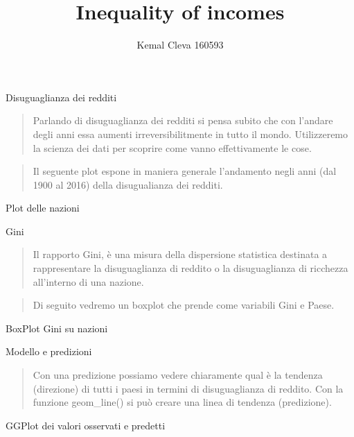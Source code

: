 \documentclass[
  ignorenonframetext,
]{beamer}
\title{Inequality of incomes}
\author{Kemal Cleva 160593}
\date{}
\begin{document}
\frame{\titlepage}

\begin{frame}{Disuguaglianza dei redditi}
\protect\hypertarget{disuguaglianza-dei-redditi}{}
\begin{quote}
Parlando di disuguaglianza dei redditi si pensa subito che con l'andare
degli anni essa aumenti irreversibilitmente in tutto il mondo.
Utilizzeremo la scienza dei dati per scoprire come vanno effettivamente
le cose.
\end{quote}

\begin{quote}
Il seguente plot espone in maniera generale l'andamento negli anni (dal
1900 al 2016) della disugualianza dei redditi.
\end{quote}
\end{frame}

\begin{frame}{Plot delle nazioni}
\protect\hypertarget{plot-delle-nazioni}{}
\end{frame}

\begin{frame}{Gini}
\protect\hypertarget{gini}{}
\begin{quote}
Il rapporto Gini, è una misura della dispersione statistica destinata a
rappresentare la disuguaglianza di reddito o la disuguaglianza di
ricchezza all'interno di una nazione.
\end{quote}

\begin{quote}
Di seguito vedremo un boxplot che prende come variabili Gini e Paese.
\end{quote}
\end{frame}

\begin{frame}{BoxPlot Gini su nazioni}
\protect\hypertarget{boxplot-gini-su-nazioni}{}
\end{frame}

\begin{frame}{Modello e predizioni}
\protect\hypertarget{modello-e-predizioni}{}
\begin{quote}
Con una predizione possiamo vedere chiaramente qual è la tendenza
(direzione) di tutti i paesi in termini di disuguaglianza di reddito.
Con la funzione geom\_line() si può creare una linea di tendenza
(predizione).
\end{quote}
\end{frame}

\begin{frame}{GGPlot dei valori osservati e predetti}
\protect\hypertarget{ggplot-dei-valori-osservati-e-predetti}{}
\end{frame}
\end{document}
